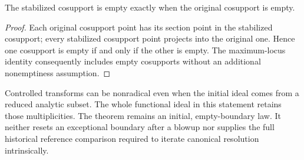 \begin{lemma}
\label{hir:disjoint-coherent-normal-initial-empty}
\leanok
The stabilized cosupport is empty exactly when the original cosupport is
empty.
\end{lemma}
\begin{proof}
Each original cosupport point has its section point in the stabilized
cosupport; every stabilized cosupport point projects into the original
one. Hence one cosupport is empty if and only if the other is empty.
The maximum-locus identity consequently includes empty cosupports without
an additional nonemptiness assumption.
\end{proof}

\begin{remark}
Controlled transforms can be nonradical even when the initial ideal comes
from a reduced analytic subset. The whole functional ideal in this
statement retains those multiplicities. The theorem remains an initial,
empty-boundary law. It neither resets an exceptional boundary after a
blowup nor supplies the full historical reference comparison required to
iterate canonical resolution intrinsically.
\end{remark}
